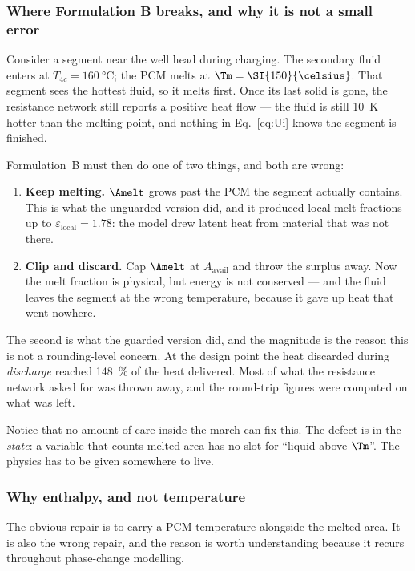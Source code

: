 \subsubsection{Where Formulation B breaks, and why it is not a small error}

Consider a segment near the well head during charging. The secondary fluid
enters at $T_{4c}=\SI{160}{\celsius}$; the PCM melts at
$\Tm=\SI{150}{\celsius}$. That segment sees the hottest fluid, so it melts
first. Once its last solid is gone, the resistance network still reports a
positive heat flow --- the fluid is still \SI{10}{\kelvin} hotter than the
melting point, and nothing in Eq.~\eqref{eq:Ui} knows the segment is finished.

Formulation~B must then do one of two things, and both are wrong:

\begin{enumerate}[leftmargin=1.7em,itemsep=2pt]
\item \textbf{Keep melting.} $\Amelt$ grows past the PCM the segment actually
  contains. This is what the unguarded version did, and it produced local melt
  fractions up to $\varepsilon_{\mathrm{local}}=1.78$: the model drew latent
  heat from material that was not there.
\item \textbf{Clip and discard.} Cap $\Amelt$ at $A_{\mathrm{avail}}$ and throw
  the surplus away. Now the melt fraction is physical, but energy is not
  conserved --- and the fluid leaves the segment at the wrong temperature,
  because it gave up heat that went nowhere.
\end{enumerate}

The second is what the guarded version did, and the magnitude is the reason this
is not a rounding-level concern. At the design point the heat discarded during
\emph{discharge} reached \SI{148}{\percent} of the heat delivered. Most of what
the resistance network asked for was thrown away, and the round-trip figures
were computed on what was left.

Notice that no amount of care inside the march can fix this. The defect is in
the \emph{state}: a variable that counts melted area has no slot for ``liquid
above $\Tm$''. The physics has to be given somewhere to live.

\subsubsection{Why enthalpy, and not temperature}

The obvious repair is to carry a PCM temperature alongside the melted area. It
is also the wrong repair, and the reason is worth understanding because it
recurs throughout phase-change modelling.


